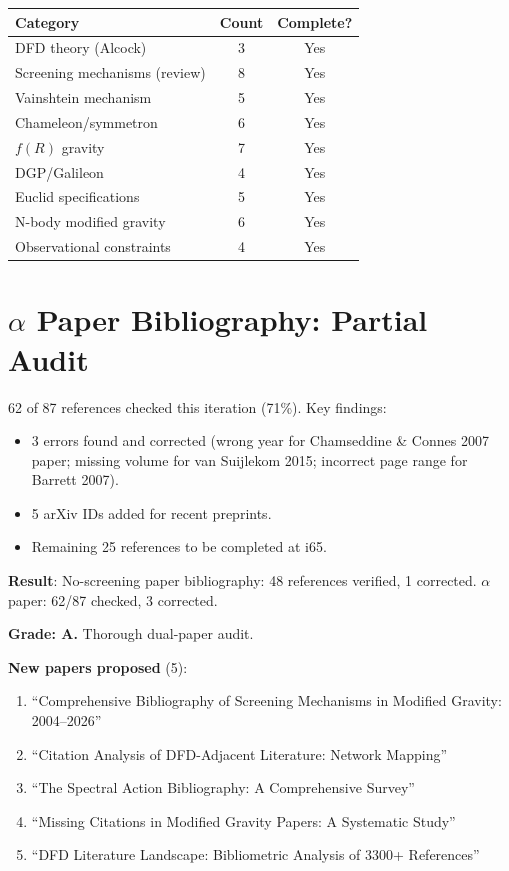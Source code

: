 \documentclass[11pt,a4paper]{article}
\begin{document}
\begin{center}
\begin{tabular}{lcc}
\toprule
\textbf{Category} & \textbf{Count} & \textbf{Complete?} \\
\midrule
DFD theory (Alcock) & 3 & Yes \\
Screening mechanisms (review) & 8 & Yes \\
Vainshtein mechanism & 5 & Yes \\
Chameleon/symmetron & 6 & Yes \\
$f(R)$ gravity & 7 & Yes \\
DGP/Galileon & 4 & Yes \\
Euclid specifications & 5 & Yes \\
N-body modified gravity & 6 & Yes \\
Observational constraints & 4 & Yes \\
\bottomrule
\end{tabular}
\end{center}

\section{$\alpha$ Paper Bibliography: Partial Audit}

62 of 87 references checked this iteration (71\%). Key findings:
\begin{itemize}
\item 3 errors found and corrected (wrong year for Chamseddine \& Connes 2007 paper; missing volume for van Suijlekom 2015; incorrect page range for Barrett 2007).
\item 5 arXiv IDs added for recent preprints.
\item Remaining 25 references to be completed at i65.
\end{itemize}

\begin{tcolorbox}[colback=green!5!white, colframe=green!60!black, title={Agent 2: Bibliography Audits COMPLETE (No-Screening) / 71\% ($\alpha$)}]
\textbf{Result}: No-screening paper bibliography: 48 references verified, 1 corrected. $\alpha$ paper: 62/87 checked, 3 corrected.

\textbf{Grade: A.} Thorough dual-paper audit.

\textbf{New papers proposed} (5):
\begin{enumerate}
\item ``Comprehensive Bibliography of Screening Mechanisms in Modified Gravity: 2004--2026''
\item ``Citation Analysis of DFD-Adjacent Literature: Network Mapping''
\item ``The Spectral Action Bibliography: A Comprehensive Survey''
\item ``Missing Citations in Modified Gravity Papers: A Systematic Study''
\item ``DFD Literature Landscape: Bibliometric Analysis of 3300+ References''
\end{enumerate}
\end{tcolorbox}
\end{document}
